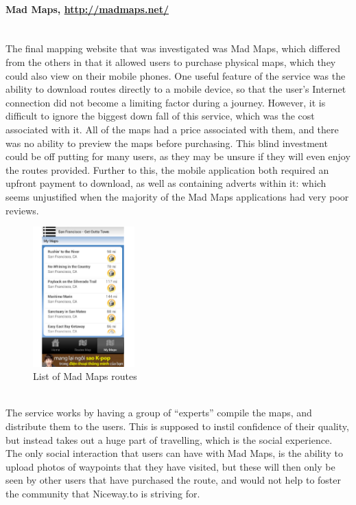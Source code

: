 \paragraph{Mad Maps, \url{http://madmaps.net/}}\ \\
The final mapping website that was investigated was Mad Maps, which differed from the others in that it allowed users to purchase physical maps, which they could also view on their mobile phones. One useful feature of the service was the ability to download routes directly to a mobile device, so that the user's Internet connection did not become a limiting factor during a journey. However, it is difficult to ignore the biggest down fall of this service, which was the cost associated with it. All of the maps had a price associated with them, and there was no ability to preview the maps before purchasing. This blind investment could be off putting for many users, as they may be unsure if they will even enjoy the routes provided. Further to this, the mobile application both required an upfront payment to download, as well as containing adverts within it: which seems unjustified when the majority of the Mad Maps applications had very poor reviews.
\begin{figure}
	\vspace{-1mm}
	\hspace{5mm}
	\includegraphics[width=0.35\textwidth]{images/background/mm_rlp.png}
	\centering
	\caption{List of Mad Maps routes}	
	\vspace{-40mm}
\end{figure}
\ \\
The service works by having a group of ``experts'' compile the maps, and distribute them to the users. This is supposed to instil confidence of their quality, but instead takes out a huge part of travelling, which is the social experience. The only social interaction that users can have with Mad Maps, is the ability to upload photos of waypoints that they have visited, but these will then only be seen by other users that have purchased the route, and would not help to foster the community that Niceway.to is striving for. 

